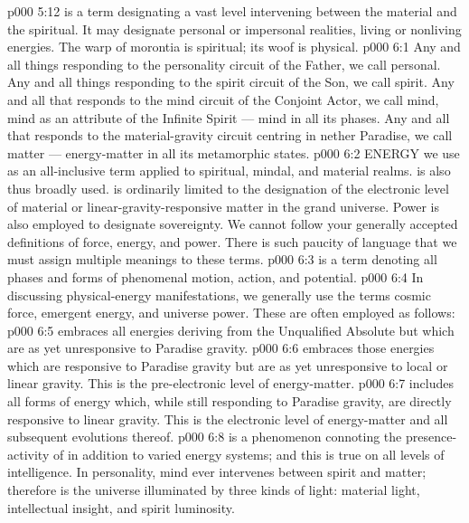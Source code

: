 \vs p000 5:12 \pc {} is a term designating a vast level intervening between the material and the spiritual. It may designate personal or impersonal realities, living or nonliving energies. The warp of morontia is spiritual; its woof is physical.
\vs p000 6:1 Any and all things responding to the personality circuit of the Father, we call personal. Any and all things responding to the spirit circuit of the Son, we call spirit. Any and all that responds to the mind circuit of the Conjoint Actor, we call mind, mind as an attribute of the Infinite Spirit --- mind in all its phases. Any and all that responds to the material\hyp{}gravity circuit centring in nether Paradise, we call matter --- energy\hyp{}matter in all its metamorphic states.
\vs p000 6:2 \pc ENERGY we use as an all\hyp{}inclusive term applied to spiritual, mindal, and material realms.  is also thus broadly used.  is ordinarily limited to the designation of the electronic level of material or linear\hyp{}gravity\hyp{}responsive matter in the grand universe. Power is also employed to designate sovereignty. We cannot follow your generally accepted definitions of force, energy, and power. There is such paucity of language that we must assign multiple meanings to these terms.
\vs p000 6:3 \pc {} is a term denoting all phases and forms of phenomenal motion, action, and potential.
\vs p000 6:4 In discussing physical\hyp{}energy manifestations, we generally use the terms cosmic force, emergent energy, and universe power. These are often employed as follows:
\vs p000 6:5 \bibnobreakspace {} embraces all energies deriving from the Unqualified Absolute but which are as yet unresponsive to Paradise gravity.
\vs p000 6:6 \bibnobreakspace {} embraces those energies which are responsive to Paradise gravity but are as yet unresponsive to local or linear gravity. This is the pre\hyp{}electronic level of energy\hyp{}matter.
\vs p000 6:7 \bibnobreakspace {} includes all forms of energy which, while still responding to Paradise gravity, are directly responsive to linear gravity. This is the electronic level of energy\hyp{}matter and all subsequent evolutions thereof.
\vs p000 6:8 \pc {} is a phenomenon connoting the presence\hyp{}activity of  in addition to varied energy systems; and this is true on all levels of intelligence. In personality, mind ever intervenes between spirit and matter; therefore is the universe illuminated by three kinds of light: material light, intellectual insight, and spirit luminosity.
